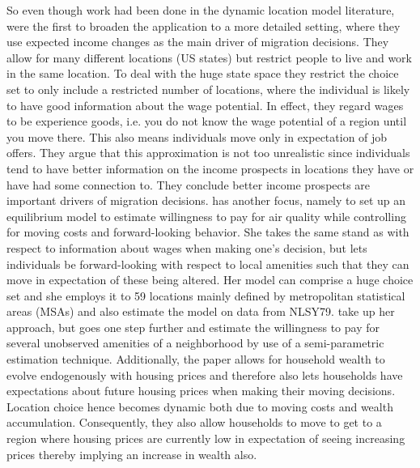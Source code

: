 So even though work had been done in the dynamic location model literature, \citet{KennanWalker2011} were the first to broaden the application to a more detailed setting, where they use expected income changes as the main driver of migration decisions. They allow for many different locations (US states) but restrict people to live and work in the same location. To deal with the huge state space they restrict the choice set to only include a restricted number of locations, where the individual is likely to have good information about the wage potential. In effect, they regard wages to be experience goods, i.e. you do not know the wage potential of a region until you move there. This also means individuals move only in expectation of job offers. They argue that this approximation is not too unrealistic since individuals tend to have better information on the income prospects in locations they have or have had some connection to. They conclude better income prospects are important drivers of migration decisions. \citet{Bishop2012} has another focus, namely to set up an equilibrium model to estimate willingness to pay for air quality while controlling for moving costs and forward-looking behavior. She takes the same stand as \citet{KennanWalker2011} with respect to information about wages when making one's decision, but lets individuals be forward-looking with respect to local amenities such that they can move in expectation of these being altered. Her model can comprise a huge choice set and she employs it to 59 locations mainly defined by metropolitan statistical areas (MSAs) and also estimate the model on data from NLSY79. \citet{Bayer2016} take up her approach, but goes one step further and estimate the willingness to pay for several unobserved amenities of a neighborhood by use of a semi-parametric estimation technique. Additionally, the paper allows for household wealth to evolve endogenously with housing prices and therefore also lets households have expectations about future housing prices when making their moving decisions. Location choice hence becomes dynamic both due to moving costs and wealth accumulation. Consequently, they also allow households to move to get to a region where housing prices are currently low in expectation of seeing increasing prices thereby implying an increase in wealth also. 

